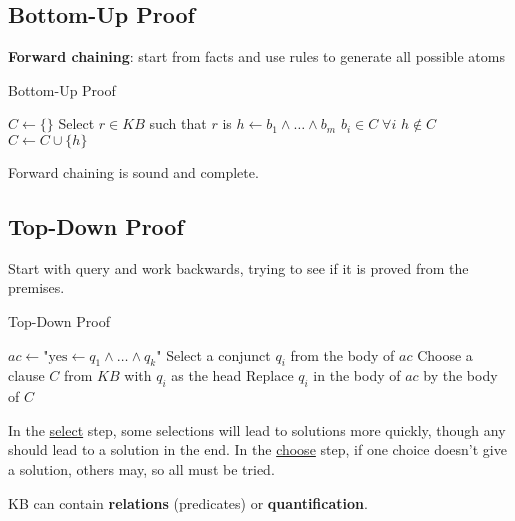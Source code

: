 \documentclass[11pt]{article}
\begin{document}
\subsection{Bottom-Up Proof}
\label{sec:orgf4a3557}
\textbf{Forward chaining}: start from facts and use rules to generate all possible atoms

\begin{algorithm}
    \caption{Bottom-Up Proof}
    \begin{algorithmic}[1]
        \State $C \gets \{\}$  
        \Repeat
            \State Select $r \in KB$ such that
            \State \quad $r$ is $h \gets b_1 \land \ldots \land b_m$
            \State \quad $b_i \in C \; \forall i$  
            \State \quad $h \notin C$  
            \State $C \gets C \cup \{h\}$  
    \end{algorithmic}
\end{algorithm}

Forward chaining is sound and complete.
\subsection{Top-Down Proof}
\label{sec:orgcf188d8}
Start with query and work backwards, trying to see if it is proved from the premises.
\begin{algorithm}
    \caption{Top-Down Proof}
    \begin{algorithmic}[1]
            \State $ac \gets \text{"yes} \gets q_1 \land \ldots \land q_k$"  
            \Repeat
                \State Select a conjunct $q_i$ from the body of $ac$
                \State Choose a clause $C$ from $KB$ with $q_i$ as the head
                \State Replace $q_i$ in the body of $ac$ by the body of $C$
        \EndProcedure
    \end{algorithmic}
\end{algorithm}

In the \uline{select} step, some selections will lead to solutions more quickly, though any should lead
to a solution in the end.
In the \uline{choose} step, if one choice doesn't give a solution, others may, so all must be tried.

KB can contain \textbf{relations} (predicates) or \textbf{quantification}.
\end{document}
